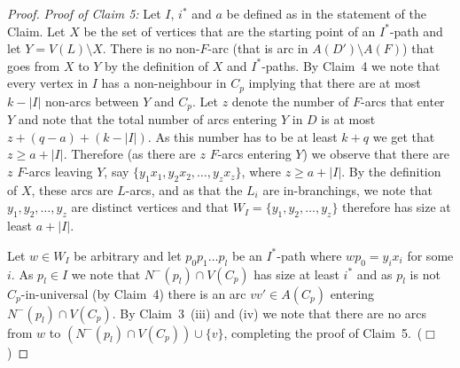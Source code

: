 \documentclass{article}
\newcommand{\smallqed}{\hfill {\tiny ($\Box$)}}
\newcommand{\2}{\vspace{2mm}}
\theoremstyle{plain}
\theoremstyle{definition}
\begin{document}
\begin{proof}
\2

{\em Proof of Claim 5:} 
Let $I$, $i^*$ and $a$ be defined as in the statement of the Claim.
Let $X$ be the set of vertices that are the starting point of an $I^*$-path and let $Y = V(L) \setminus X$.
There is no non-$F$-arc (that is arc in $A(D')\setminus A(F)$) that goes from $X$ to $Y$ by the definition of $X$ and $I^*$-paths.
By Claim~4 we note that every vertex in $I$ has a non-neighbour in $C_p$ implying that there are at most
$k-|I|$ non-arcs between $Y$ and $C_p$. Let $z$ denote the number of $F$-arcs that enter $Y$ and note that the
total number of arcs entering $Y$ in $D$ is at most $z + (q-a) + (k-|I|)$. As this number has to be at least $k+q$ we 
get that $z \geq a+|I|$.  Therefore (as there are $z$ $F$-arcs entering $Y$) we observe that there are $z$  $F$-arcs 
leaving $Y$, say $\{y_1x_1,y_2x_2,\ldots,y_z x_z\}$, where $z \geq a + |I|$.
By the definition of $X$, these arcs are $L$-arcs, and as that the $L_i$ are in-branchings, we note that $y_1,y_2,\ldots,y_z$ are distinct
vertices and that $W_I = \{y_1,y_2,\ldots,y_z\}$ therefore has size at least $a + |I|$.

Let $w \in W_I$ be arbitrary and let $p_0 p_1 \ldots p_l$ be an $I^*$-path where $w p_0 = y_i x_i$ for some $i$.
As $p_l \in I$ we note that $N^-(p_l) \cap V(C_p)$ has size at least $i^*$ and as $p_l$ is not $C_p$-in-universal (by 
Claim~4) there is an arc $vv' \in A(C_p)$ entering $N^-(p_l) \cap V(C_p)$. 
By Claim~3~(iii) and (iv) we note that there are no arcs from $w$ to $(N^-(p_l) \cap V(C_p)) \cup \{v\}$, completing the
proof of Claim~5.~\smallqed{}



\end{proof}
\end{document}
